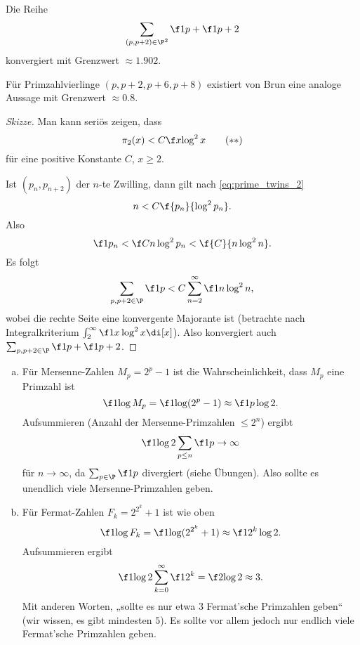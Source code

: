 \begin{st}[V. Brun, 1913] \label{7.14}
	Die Reihe
	\[
		\sum_{(p,p+2) \in \P^2} \f 1p + \f 1{p+2}
	\]
	konvergiert mit Grenzwert $\approx 1.902$.
	\begin{note}
		Für Primzahlvierlinge $(p, p+2, p+6, p+8)$ existiert von Brun eine analoge Aussage mit Grenzwert $\approx 0.8$.
	\end{note}
	\begin{proof}[Skizze]
		Man kann seriös zeigen, dass
		\begin{equation} \label{eq:prime_twins_2}
			\pi_2(x) < C \f x{\log^2 x} \tag{$\ast\ast$}
		\end{equation}
		für eine positive Konstante $C$, $x \ge 2$.

		Ist $(p_n, p_{n+2})$ der $n$-te Zwilling, dann gilt nach \eqref{eq:prime_twins_2}
		\[
			n < C \f{p_n}{\log^2 p_n}.
		\]
		Also
		\[
			\f 1{p_n} < \f C{n \log^2 p_n} < \f {C}{n \log^2 n}.
		\]
		Es folgt
		\[
			\sum_{p,p+2 \in \P} \f 1p
			< C \sum_{n=2}^\infty \f 1{n \log^2 n},
		\]
		wobei die rechte Seite eine konvergente Majorante ist (betrachte nach Integralkriterium $\int_2^\infty \f 1{x \log^2 x} \di[x]$).
		Also konvergiert auch $\sum_{p,p+2 \in \P} \f 1p + \f 1{p+2}$.
	\end{proof}
\end{st}

\begin{nt} \label{7.15}
	\begin{enumerate}[a)]
		\item
			Für Mersenne-Zahlen $M_p = 2^p - 1$ ist die Wahrscheinlichkeit, dass $M_p$ eine Primzahl ist
			\[
				\f 1{\log M_p}
				= \f 1{\log (2^p - 1)}
				\approx \f 1{p \log 2}.
			\]
			Aufsummieren (Anzahl der Mersenne-Primzahlen $\le 2^n$) ergibt
			\[
				\f 1{\log 2} \sum_{p \le n} \f 1p \to \infty
			\]
			für $n \to \infty$, da $\sum_{p \in \P} \f 1p$ divergiert (siehe Übungen).
			Also sollte es unendlich viele Mersenne-Primzahlen geben.
		\item
			Für Fermat-Zahlen $F_k = 2^{2^k} + 1$ ist wie oben
			\[
				\f 1{\log F_k}
				= \f 1{\log(2^{2^k} + 1)}
				\approx \f 1{2^k \log 2}.
			\]
			Aufsummieren ergibt
			\[
				\f 1{\log 2} \sum_{k=0}^\infty \f 1{2^k} = \f 2{\log 2} \approx 3.
			\]
			Mit anderen Worten, „sollte es nur etwa $3$ Fermat'sche Primzahlen geben“ (wir wissen, es gibt mindesten $5$).
			Es sollte vor allem jedoch nur endlich viele Fermat'sche Primzahlen geben.
	\end{enumerate}
\end{nt}

